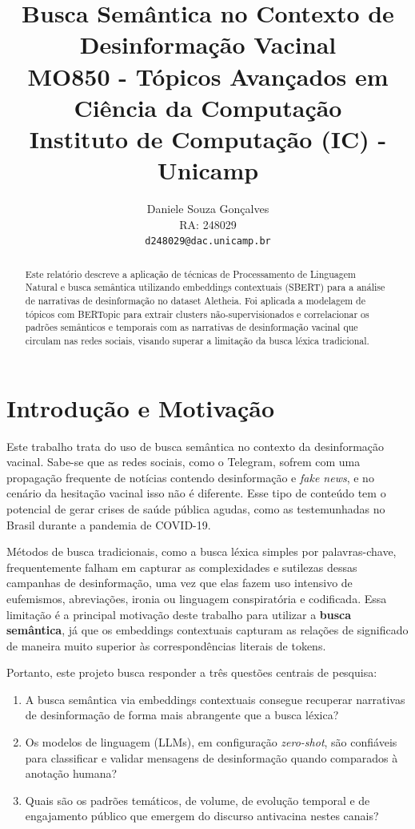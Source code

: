 \documentclass[10pt,twocolumn,a4paper]{article}
\title{\textbf{Busca Semântica no Contexto de Desinformação Vacinal}\\[0.3cm]
\large MO850 - Tópicos Avançados em Ciência da Computação\\[0.1cm]Instituto de Computação (IC) - Unicamp}
\author{Daniele Souza Gonçalves\\ RA: 248029 \\ \texttt{d248029@dac.unicamp.br}}
\date{}
\begin{document}
\maketitle

\begin{abstract}
Este relatório descreve a aplicação de técnicas de Processamento de Linguagem Natural e busca semântica utilizando embeddings contextuais (SBERT) para a análise de narrativas de desinformação no dataset Aletheia. Foi aplicada a modelagem de tópicos com BERTopic para extrair clusters não-supervisionados e correlacionar os padrões semânticos e temporais com as narrativas de desinformação vacinal que circulam nas redes sociais, visando superar a limitação da busca léxica tradicional.
\end{abstract}

\section{Introdução e Motivação}

Este trabalho trata do uso de busca semântica no contexto da desinformação vacinal. Sabe-se que as redes sociais, como o Telegram, sofrem com uma propagação frequente de notícias contendo desinformação e \textit{fake news}, e no cenário da hesitação vacinal isso não é diferente. Esse tipo de conteúdo tem o potencial de gerar crises de saúde pública agudas, como as testemunhadas no Brasil durante a pandemia de COVID-19.

Métodos de busca tradicionais, como a busca léxica simples por palavras-chave, frequentemente falham em capturar as complexidades e sutilezas dessas campanhas de desinformação, uma vez que elas fazem uso intensivo de eufemismos, abreviações, ironia ou linguagem conspiratória e codificada. Essa limitação é a principal motivação deste trabalho para utilizar a \textbf{busca semântica}, já que os embeddings contextuais capturam as relações de significado de maneira muito superior às correspondências literais de tokens.

Portanto, este projeto busca responder a três questões centrais de pesquisa:
\begin{enumerate}
    \item A busca semântica via embeddings contextuais consegue recuperar narrativas de desinformação de forma mais abrangente que a busca léxica?
    \item Os modelos de linguagem (LLMs), em configuração \textit{zero-shot}, são confiáveis para classificar e validar mensagens de desinformação quando comparados à anotação humana?
    \item Quais são os padrões temáticos, de volume, de evolução temporal e de engajamento público que emergem do discurso antivacina nestes canais?
\end{enumerate}
\end{document}
